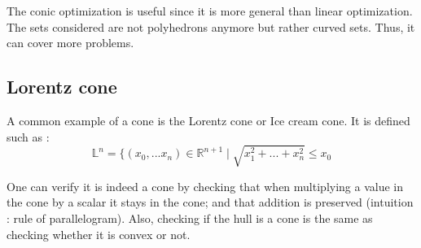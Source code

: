 \documentclass[10pt,a4paper]{article}
\begin{document}
\noindent The conic optimization is useful since it is more general than linear optimization. The sets considered are not polyhedrons anymore but rather curved sets. Thus, it can cover more problems.


\subsection{Lorentz cone}
A common example of a cone is the Lorentz cone or Ice cream cone. It is defined such as : 
\[
\mathbb{L}^n = \{(x_0,...x_n) \in \mathbb{R}^{n+1} \mid \sqrt{x_1^2+...+x_n^2} \le x_0 
\]

One can verify it is indeed a cone by checking that when multiplying a value in the cone by a scalar it stays in the cone; and that addition is preserved (intuition : rule of parallelogram). Also, checking if the hull is a cone is the same as checking whether it is convex or not.
\end{document}
